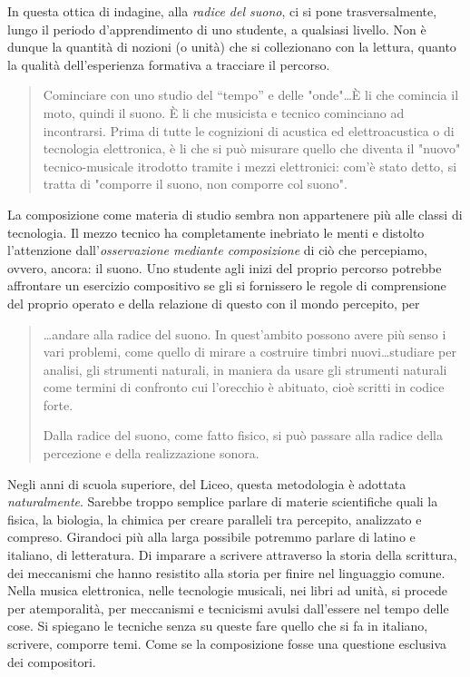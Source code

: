 In questa ottica di indagine, alla \emph{radice del suono}, ci si pone
trasversalmente, lungo il periodo d'apprendimento di uno studente, a qualsiasi
livello. Non è dunque la quantità di nozioni (o unità) che si collezionano con
la lettura, quanto la qualità dell'esperienza formativa a tracciare il percorso.

\begin{quote}
  Cominciare con uno studio del “tempo” e delle "onde"\ldots È li che comincia
  il moto, quindi il suono. È li che musicista e tecnico cominciano ad
  incontrarsi. Prima di tutte le cognizioni di acustica ed elettroacustica o di
  tecnologia elettronica, è li che si può misurare quello che diventa il "nuovo"
  tecnico-musicale itrodotto tramite i mezzi elettronici: com'è stato detto, si
  tratta di "comporre il suono, non comporre col suono".
\end{quote}

La composizione come materia di studio sembra non appartenere più alle classi di
tecnologia. Il mezzo tecnico ha completamente inebriato le menti e distolto
l'attenzione dall'\emph{osservazione mediante composizione} di ciò che percepiamo,
ovvero, ancora: il suono. Uno studente agli inizi del proprio percorso potrebbe
affrontare un esercizio compositivo se gli si fornissero le regole di
comprensione del proprio operato e della relazione di questo con il mondo percepito, per

\begin{quote}
  \ldots andare alla radice del suono. In quest'ambito possono avere più senso
  i vari problemi, come quello di mirare a costruire timbri nuovi\ldots studiare
  per analisi, gli strumenti naturali, in maniera da usare gli strumenti naturali
  come termini di confronto cui l'orecchio è abituato, cioè scritti in codice
  forte.

  Dalla radice del suono, come fatto fisico, si può passare alla radice della
  percezione e della realizzazione sonora.
\end{quote}

Negli anni di scuola superiore, del Liceo, questa metodologia è adottata
\emph{naturalmente}. Sarebbe troppo semplice parlare di materie scientifiche
quali la fisica, la biologia, la chimica per creare paralleli tra percepito,
analizzato e compreso. Girandoci più alla larga possibile potremmo parlare di
latino e italiano, di letteratura. Di imparare a scrivere attraverso la storia
della scrittura, dei meccanismi che hanno resistito alla storia per finire nel
linguaggio comune. Nella musica elettronica, nelle tecnologie musicali, nei
libri ad unità, si procede per atemporalità, per meccanismi e tecnicismi avulsi
dall'essere nel tempo delle cose. Si spiegano le tecniche senza su queste fare
quello che si fa in italiano, scrivere, comporre temi. Come se la composizione
fosse una questione esclusiva dei compositori.

